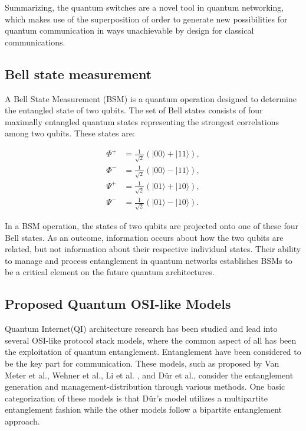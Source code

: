 \documentclass[12pt]{ieeetj}
\begin{document}
		Summarizing, the quantum switches are a novel tool in quantum networking, 
		which makes use of the superposition of order to generate new possibilities for 
		quantum communication in ways unachievable by design for classical communications. 

		\subsection{Bell state measurement}

		A Bell State Measurement (BSM) is a quantum operation designed to determine
		the entangled state of two qubits. The set of Bell states consists of four 
		maximally entangled quantum states representing the strongest correlations
		among two qubits. These states are:

			\begin{align*}
			    \Phi^+ &= \frac{1}{\sqrt{2}} (|00\rangle + |11\rangle), \\
			    \Phi^- &= \frac{1}{\sqrt{2}} (|00\rangle - |11\rangle), \\
			    \Psi^+ &= \frac{1}{\sqrt{2}} (|01\rangle + |10\rangle), \\
			    \Psi^- &= \frac{1}{\sqrt{2}} (|01\rangle - |10\rangle).
			\end{align*}

		In a BSM operation, the states of two qubits are projected onto one of these four Bell states. 
		As an outcome, information occurs about how the two qubits are related, but not information
		about their respective individual states. Their ability to manage and process entanglement
		in quantum networks establishes BSMs to be a critical element on the future quantum architectures. 


		\subsection{Proposed Quantum OSI-like Models}
		
		Quantum Internet(QI) architecture research has been studied and lead into several OSI-like protocol 
		stack models, where the common aspect of all has been the exploitation of
		quantum entanglement. Entanglement have been considered to be the key part for communication. 
		These models, such as proposed by Van Meter et al.\cite{quantum-arch}, 
		Wehner et al.\cite{wehner-arch}, Li et al. \cite{li-arch}, and Dür et al.\cite{dur-multipartite}, 
		consider the entanglement generation and management-distribution through various methods.
		One basic categorization of these models is that Dür's model utilizes a multipartite entanglement fashion
		while the other models follow a bipartite entanglement approach.
		
\end{document}
